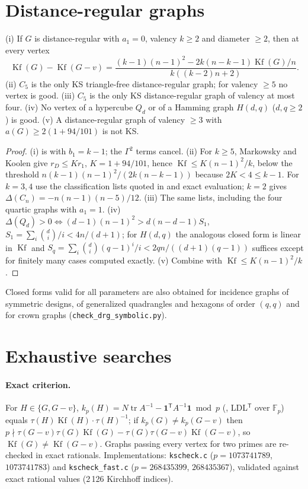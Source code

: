 \documentclass[11pt,a4paper]{report}
\newcommand{\Kf}{\operatorname{Kf}}
\newcommand{\one}{\mathbf{1}}
\begin{document}
\section{Distance-regular graphs}
\begin{theorem}\label{thm:drg}
(i) If $G$ is distance-regular with $a_1=0$, valency $k\ge2$ and diameter $\ge2$, then at every vertex
\[
\Kf(G)-\Kf(G-v)=\frac{(k-1)(n-1)^2-2k(n-k-1)\Kf(G)/n}{k((k-2)n+2)}.
\]
(ii) $C_5$ is the only KS triangle-free distance-regular graph; for valency $\ge5$ no vertex is good.
(iii) $C_5$ is the only KS distance-regular graph of valency at most four.
(iv) No vertex of a hypercube $Q_d$ or of a Hamming graph $H(d,q)$ ($d,q\ge2$) is good.
(v) A distance-regular graph of valency $\ge3$ with $a(G)\ge2(1+94/101)$ is not KS.
\end{theorem}
\begin{proof}
(i) is  with $b_1=k-1$; the $\Gamma^2$ terms cancel. (ii) For $k\ge5$, Markowsky and Koolen
\autocite[Theorem~1]{MK10} give $r_D\le Kr_1$, $K=1+94/101$, hence $\Kf\le K(n-1)^2/k$, below the threshold
$n(k-1)(n-1)^2/(2k(n-k-1))$ because $2K<4\le k-1$. For $k=3,4$ use the classification lists
\autocite{BCN89,BK99} quoted in \autocite[Cases 2--3]{MK10} and exact evaluation; $k=2$ gives
$\Delta(C_n)=-n(n-1)(n-5)/12$. (iii) The same lists, including the four quartic graphs with $a_1=1$.
(iv) $\Delta(Q_d)>0\iff(d-1)(n-1)^2>d(n-d-1)S_1$, $S_1=\sum_i\binom di/i<4n/(d+1)$; for $H(d,q)$ the analogous
closed form is linear in $\Kf$ and $S_q=\sum_i\binom di(q-1)^i/i<2qn/((d+1)(q-1))$ suffices except for finitely
many cases computed exactly. (v) Combine  with $\Kf\le K(n-1)^2/k$.
\end{proof}
Closed forms valid for all parameters are also obtained for incidence graphs of symmetric designs, of
generalized quadrangles and hexagons of order $(q,q)$ and for crown graphs (\texttt{check\_drg\_symbolic.py}).

\section{Exhaustive searches}\label{sec:search}
\paragraph{Exact criterion.} For $H\in\{G,G-v\}$, $k_p(H)=N\operatorname{tr}A^{-1}-\one^{\mathsf T}A^{-1}\one\bmod p$
(, LDL$^{\mathsf T}$ over $\mathbb F_p$) equals $\tau(H)\Kf(H)\cdot\tau(H)^{-1}$; if
$k_p(G)\ne k_p(G-v)$ then $p\nmid\tau(G-v)\tau(G)\Kf(G)-\tau(G)\tau(G-v)\Kf(G-v)$, so $\Kf(G)\ne\Kf(G-v)$. Graphs
passing every vertex for two primes are re-checked in exact rationals. Implementations:
\texttt{kscheck.c} ($p=1073741789$, $1073741783$) and \texttt{kscheck\_fast.c} ($p=268435399$, $268435367$),
validated against exact rational values (2\,126 Kirchhoff indices).
\end{document}
